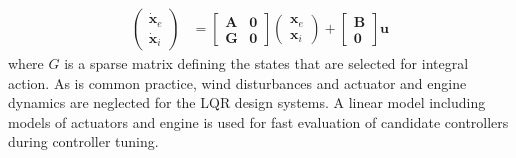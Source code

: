 \documentclass{ifacconf}
\newcommand{\mbf}[1]{\mathbf{#1}}
\providecommand{\mbf}[1]{\mathbf{#1}}
\begin{document}
\begin{align}
\begin{pmatrix}
\dot{\mbf{x}}_e \\
\dot{\mbf{x}}_i
\end{pmatrix}
&=
\begin{bmatrix}
\mbf{A} & \mbf{0} \\
\mbf{G} & \mbf{0}
\end{bmatrix}
\begin{pmatrix}
\mbf{x}_e \\
\mbf{x}_i
\end{pmatrix}
+
\begin{bmatrix}
\mbf{B} \\
\mbf{0}
\end{bmatrix}
\mbf{u}
\label{eq:integerrorss}
\end{align}
where $G$ is a sparse matrix defining the states that are selected for integral action. As is common practice, wind disturbances and actuator and engine dynamics are neglected for the LQR design systems. A linear model including models of actuators and engine is used for fast evaluation of candidate controllers during controller tuning.
\end{document}
